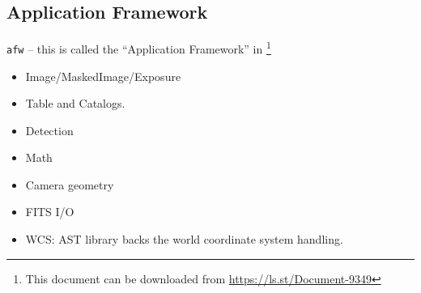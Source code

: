 \subsection{Application Framework}
\label{sec:afw}
\texttt{afw} -- this is called the ``Application Framework'' in \citet{2010SPIE.7740E..15A}\footnote{This document can be downloaded from \url{https://ls.st/Document-9349}}

\begin{itemize}
\item Image/MaskedImage/Exposure
\item Table and Catalogs.
\item Detection
\item Math
\item Camera geometry
\item FITS I/O
\item WCS: AST library \citep{2016A&C....15...33B} backs the world coordinate system handling.
\end{itemize}
